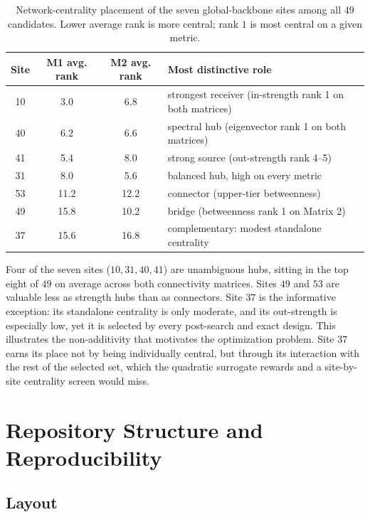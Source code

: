 \documentclass[11pt]{article}
\begin{document}
\begin{table}[H]
\centering
\caption{Network-centrality placement of the seven global-backbone sites among all $49$ candidates. Lower average rank is more central; rank $1$ is most central on a given metric.}
\label{tab:centrality}
\small
\begin{tabularx}{\linewidth}{@{}c c c X@{}}
\toprule
\textbf{Site} & \textbf{M1 avg. rank} & \textbf{M2 avg. rank} & \textbf{Most distinctive role} \\
\midrule
10 & 3.0  & 6.8  & strongest receiver (in-strength rank 1 on both matrices) \\
40 & 6.2  & 6.6  & spectral hub (eigenvector rank 1 on both matrices) \\
41 & 5.4  & 8.0  & strong source (out-strength rank 4--5) \\
31 & 8.0  & 5.6  & balanced hub, high on every metric \\
53 & 11.2 & 12.2 & connector (upper-tier betweenness) \\
49 & 15.8 & 10.2 & bridge (betweenness rank 1 on Matrix 2) \\
37 & 15.6 & 16.8 & complementary: modest standalone centrality \\
\bottomrule
\end{tabularx}
\end{table}

Four of the seven sites ($10,31,40,41$) are unambiguous hubs, sitting in the top eight of $49$ on average across both connectivity matrices. Sites $49$ and $53$ are valuable less as strength hubs than as connectors. Site $37$ is the informative exception: its standalone centrality is only moderate, and its out-strength is especially low, yet it is selected by every post-search and exact design. This illustrates the non-additivity that motivates the optimization problem. Site $37$ earns its place not by being individually central, but through its interaction with the rest of the selected set, which the quadratic surrogate rewards and a site-by-site centrality screen would miss.

\section{Repository Structure and Reproducibility}

\subsection{Layout}
\end{document}
